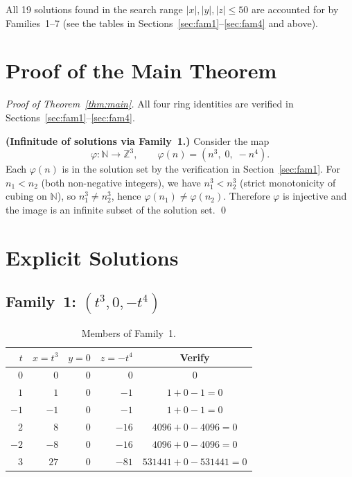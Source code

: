 \documentclass[12pt,a4paper]{article}
\theoremstyle{definition}
\newcommand{\Z}{\mathbb{Z}}
\newcommand{\N}{\mathbb{N}}
\begin{document}
All 19 solutions found in the search range $|x|,|y|,|z|\leq 50$ are accounted for
by Families~1--7 (see the tables in Sections~\ref{sec:fam1}--\ref{sec:fam4} and above).

\section{Proof of the Main Theorem}\label{sec:proof}

\begin{proof}[Proof of Theorem~\ref{thm:main}]
  All four ring identities are verified in Sections~\ref{sec:fam1}--\ref{sec:fam4}.

  \textbf{(Infinitude of solutions via Family~1.)}
  Consider the map
  \[
    \varphi : \N \to \Z^3, \qquad \varphi(n) = (n^3,\; 0,\; -n^4).
  \]
  Each $\varphi(n)$ is in the solution set by the verification in Section~\ref{sec:fam1}.
  For $n_1 < n_2$ (both non-negative integers), we have $n_1^3 < n_2^3$
  (strict monotonicity of cubing on $\N$), so $n_1^3 \neq n_2^3$, hence
  $\varphi(n_1) \neq \varphi(n_2)$.  Therefore $\varphi$ is injective and the
  image is an infinite subset of the solution set.
  \qed
\end{proof}

\section{Explicit Solutions}\label{sec:explicit}

\subsection{Family~1: $(t^3, 0, -t^4)$}

\begin{table}[h]
\centering
\caption{Members of Family~1.}
\label{tab:family1}
\renewcommand{\arraystretch}{1.2}
\begin{tabular}{rrrrc}
\toprule
$t$ & $x = t^3$ & $y = 0$ & $z = -t^4$ & Verify \\
\midrule
$0$  & $0$    & $0$ & $0$     & $0$ \\
$1$  & $1$    & $0$ & $-1$    & $1+0-1=0$ \\
$-1$ & $-1$   & $0$ & $-1$    & $1+0-1=0$ \\
$2$  & $8$    & $0$ & $-16$   & $4096+0-4096=0$ \\
$-2$ & $-8$   & $0$ & $-16$   & $4096+0-4096=0$ \\
$3$  & $27$   & $0$ & $-81$   & $531441+0-531441=0$ \\
\bottomrule
\end{tabular}
\end{table}
\end{document}
